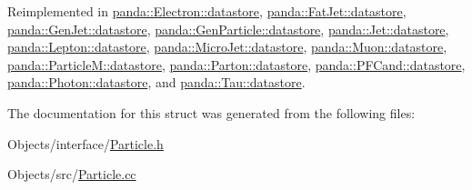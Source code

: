 Reimplemented in \hyperlink{structpanda_1_1Electron_1_1datastore_af2c384514f539bcc78e55284b7eb3b67}{panda::Electron::datastore}, \hyperlink{structpanda_1_1FatJet_1_1datastore_a7c0b79a4a6e7875278841d4bc8a7deba}{panda::FatJet::datastore}, \hyperlink{structpanda_1_1GenJet_1_1datastore_a7b9f67fdc168e7a372a9430c2b9866e3}{panda::GenJet::datastore}, \hyperlink{structpanda_1_1GenParticle_1_1datastore_ae4c5f9b8868d49879bba872aeb7b1027}{panda::GenParticle::datastore}, \hyperlink{structpanda_1_1Jet_1_1datastore_ae5a3ebcab7eefec1efc08e4f714ce2ad}{panda::Jet::datastore}, \hyperlink{structpanda_1_1Lepton_1_1datastore_a0a158cefd0f32a98625eb5736c414b01}{panda::Lepton::datastore}, \hyperlink{structpanda_1_1MicroJet_1_1datastore_a5dad86e6e7ed7f7ee5ffb793bb81cbbe}{panda::MicroJet::datastore}, \hyperlink{structpanda_1_1Muon_1_1datastore_a930f982ca62e2c7ceeb62dfcd5e03db9}{panda::Muon::datastore}, \hyperlink{structpanda_1_1ParticleM_1_1datastore_a0329bec2c84d16ff16e15824890e7a86}{panda::ParticleM::datastore}, \hyperlink{structpanda_1_1Parton_1_1datastore_a923a18c356315d4083798fe11bb2c942}{panda::Parton::datastore}, \hyperlink{structpanda_1_1PFCand_1_1datastore_a7efac265d60666c7ce27d78adbbf0fbb}{panda::PFCand::datastore}, \hyperlink{structpanda_1_1Photon_1_1datastore_a809ca2b31f632a8503ee2dc839be55ed}{panda::Photon::datastore}, and \hyperlink{structpanda_1_1Tau_1_1datastore_a528e0b260c39c11862f8631cf9e1743e}{panda::Tau::datastore}.

The documentation for this struct was generated from the following files:\begin{DoxyCompactItemize}
\item 
Objects/interface/\hyperlink{Particle_8h}{Particle.h}\item 
Objects/src/\hyperlink{Particle_8cc}{Particle.cc}\end{DoxyCompactItemize}
